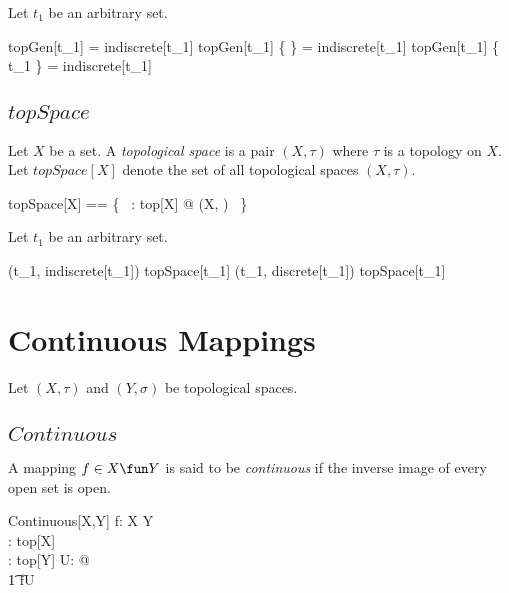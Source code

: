 \documentclass[11pt, oneside]{article}
\begin{document}
\begin{example}
Let $t_1$ be an arbitrary set.

\begin{zed}
	topGen[t_1] \emptyset = indiscrete[t_1]
\also
	topGen[t_1] \{ \emptyset \} = indiscrete[t_1]
\also
	topGen[t_1] \{ t_1 \} = indiscrete[t_1]
\end{zed}

\end{example}

\subsection{$topSpace$}

Let $X$ be a set.
A {\it topological space} is a pair $(X, \tau)$ where $\tau$ is a topology on $X$.
Let $topSpace[X]$ denote the set of all topological spaces $(X,\tau)$.

\begin{zed}
	topSpace[X] == \{~ \tau: top[X] @ (X, \tau) ~\}
\end{zed}

\begin{example}
Let $t_1$ be an arbitrary set.

\begin{zed}
	(t_1, indiscrete[t_1]) \in topSpace[t_1]
\also
	(t_1, discrete[t_1]) \in topSpace[t_1]
\end{zed}

\end{example}

\section{Continuous Mappings}

Let $(X,\tau)$ and $(Y,\sigma)$ be topological spaces.

\subsection{$Continuous$}

A mapping $f \in X \fun Y$ is said to be {\it continuous} if the inverse image of every open set is open.

\begin{schema}{Continuous}[X,Y]
	f: X \fun Y \\
	\tau: top[X] \\
	\sigma: top[Y]
\where
	\forall U: \sigma @ \\
	\t1	f\inv\limg U \rimg \in \tau
\end{schema}
\end{document}
